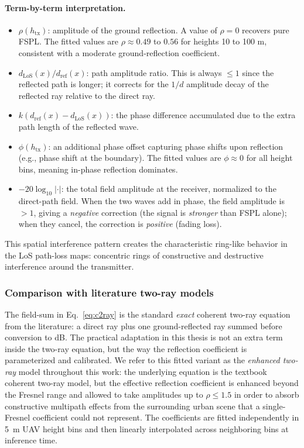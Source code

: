 \paragraph{Term-by-term interpretation.}
\begin{itemize}
\item $\rho(h_{\mathrm{tx}})$: amplitude of the ground reflection. A value of
      $\rho = 0$ recovers pure FSPL. The fitted values are $\rho \approx
      0.49$ to $0.56$ for heights 10 to 100 m, consistent with a moderate
      ground-reflection coefficient.
\item $d_{\mathrm{LoS}}(x)/d_{\mathrm{ref}}(x)$: path amplitude ratio. This
      is always $\le 1$ since the reflected path is longer; it corrects for
      the $1/d$ amplitude decay of the reflected ray relative to the direct
      ray.
\item $k(d_{\mathrm{ref}}(x) - d_{\mathrm{LoS}}(x))$: the phase difference
      accumulated due to the extra path length of the reflected wave.
\item $\phi(h_{\mathrm{tx}})$: an additional phase offset capturing phase
      shifts upon reflection (e.g., phase shift at the boundary). The fitted
      values are $\phi \approx 0$ for all height bins, meaning in-phase
      reflection dominates.
\item $-20\log_{10}|\cdot|$: the total field amplitude at the receiver,
      normalized to the direct-path field. When the two waves add in phase, the
      field amplitude is $> 1$, giving a \emph{negative} correction (the signal
      is \emph{stronger} than FSPL alone); when they cancel, the correction is
      \emph{positive} (fading loss).
\end{itemize}

This spatial interference pattern creates the characteristic ring-like
behavior in the LoS path-loss maps: concentric rings of constructive and
destructive interference around the transmitter.

\subsubsection{Comparison with literature two-ray models}

The field-sum in Eq.~\eqref{eq:c2ray} is the standard \emph{exact} coherent
two-ray equation from the literature: a direct ray plus one ground-reflected
ray summed before conversion to dB. The practical adaptation in this thesis
is not an extra term inside the two-ray equation, but the way the reflection
coefficient is parameterized and calibrated. We refer to this fitted variant
as the \emph{enhanced two-ray} model throughout this work: the underlying
equation is the textbook coherent two-ray model, but the effective reflection
coefficient is enhanced beyond the Fresnel range and allowed to take
amplitudes up to $\rho \le 1.5$ in order to absorb constructive multipath
effects from the surrounding urban scene that a single-Fresnel coefficient
could not represent. The coefficients are fitted
independently in 5~m UAV height bins and then linearly interpolated across
neighboring bins at inference time.

